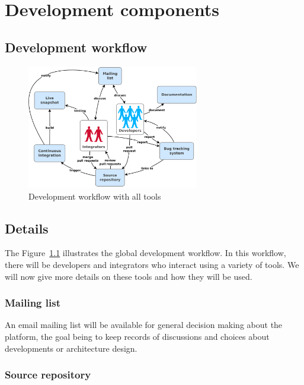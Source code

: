 \chapter{Development components}
\label{ch:development-components}

\section{Development workflow}
\label{sec:development-workflow}

\begin{figure}
\centering
\includegraphics[width=0.67\textwidth]{images/development-workflow.png}
\caption{Development workflow with all tools}
\label{fig:development-workflow}
\end{figure}

\section{Details}
\label{sec:details}

The Figure~\ref{fig:development-workflow} illustrates the global development workflow.
In this workflow, there will be developers and integrators who interact using a variety of tools.
We will now give more details on these tools and how they will be used.

\subsection{Mailing list}
\label{sec:mailing-list}

An email mailing list will be available for general decision making about the platform,
the goal being to keep records of discussions and choices about developments or architecture design.

\subsection{Source repository}
\label{sec:source-repository}

